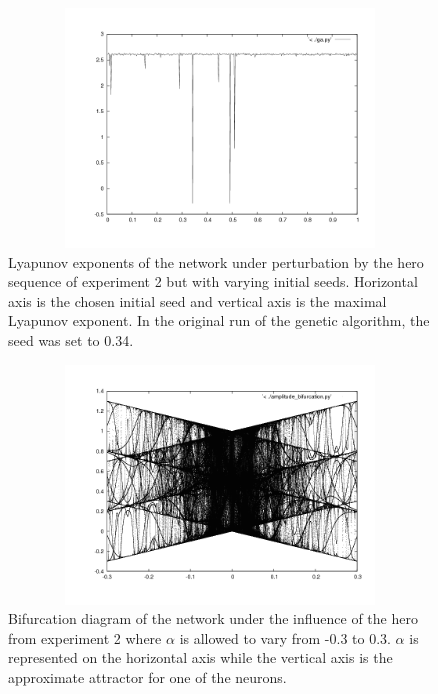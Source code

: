 \documentclass[12pt]{article}
\begin{document}
\begin{figure}[htb]
\begin{center}
\includegraphics[height=2.5in,width=4.5in]{images/lyap_hero.png}
\caption{Lyapunov exponents of the network under perturbation by the hero sequence of experiment 2 but with varying initial seeds.  Horizontal axis is the chosen initial seed and vertical axis is the maximal Lyapunov exponent.  In the original run of the genetic algorithm, the seed was set to 0.34.}
\end{center}
\end{figure}
\begin{figure}[htb]
\begin{center}
\includegraphics[height=2.5in,width=4.5in]{images/big_bifurcation.png}
\caption{Bifurcation diagram of the network under the influence of the hero from experiment 2 where $\alpha$ is allowed to vary from -0.3 to 0.3.  $\alpha$ is represented on the horizontal axis while the vertical axis is the approximate attractor for one of the neurons.}
\end{center}
\end{figure}
\end{document}

